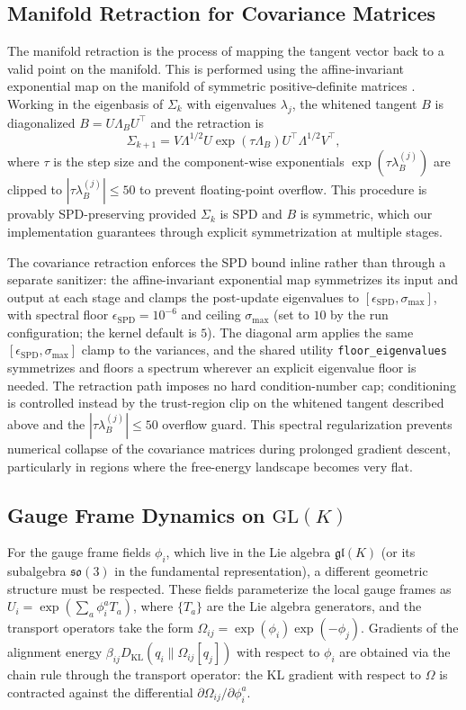 \documentclass[twoside,11pt]{article}
\begin{document}
\subsection{Manifold Retraction for Covariance Matrices}\label{sec:retraction}
The manifold retraction is the process of mapping the tangent vector back to a valid point on the manifold. This is performed using the affine-invariant exponential map on the manifold of symmetric positive-definite matrices \citep{Pennec2006,Bhatia2007,Absil2008}. Working in the eigenbasis of $\Sigma_k$ with eigenvalues $\lambda_j$, the whitened tangent $B$ is diagonalized $B = U\Lambda_B U^\top$ and the retraction is
\begin{equation}
\Sigma_{k+1} = V \Lambda^{1/2} U \exp(\tau \Lambda_B) U^\top \Lambda^{1/2} V^\top,
\end{equation}
where $\tau$ is the step size and the component-wise exponentials $\exp(\tau \lambda_B^{(j)})$ are clipped to $|\tau \lambda_B^{(j)}| \le 50$ to prevent floating-point overflow. This procedure is provably SPD-preserving provided $\Sigma_k$ is SPD and $B$ is symmetric, which our implementation guarantees through explicit symmetrization at multiple stages.

The covariance retraction enforces the SPD bound inline rather than through a
separate sanitizer: the affine-invariant exponential map symmetrizes its input and
output at each stage and clamps the post-update eigenvalues to
$[\epsilon_{\mathrm{SPD}}, \sigma_{\max}]$, with spectral floor
$\epsilon_{\mathrm{SPD}} = 10^{-6}$ and ceiling $\sigma_{\max}$ (set to $10$ by the
run configuration; the kernel default is $5$). The diagonal arm applies the same
$[\epsilon_{\mathrm{SPD}}, \sigma_{\max}]$ clamp to the variances, and the shared
utility \texttt{floor\_eigenvalues} symmetrizes and floors a spectrum wherever an
explicit eigenvalue floor is needed. The retraction path imposes no hard condition-number cap; conditioning is
controlled instead by the trust-region clip on the whitened tangent described above
and the $|\tau\lambda_B^{(j)}| \le 50$ overflow guard. This spectral regularization
prevents numerical collapse of the covariance matrices during prolonged gradient
descent, particularly in regions where the free-energy landscape becomes very flat.

\subsection{Gauge Frame Dynamics on $\mathrm{GL}(K)$}
For the gauge frame fields $\phi_i$, which live in the Lie algebra $\mathfrak{gl}(K)$ (or its subalgebra $\mathfrak{so}(3)$ in the fundamental representation), a different geometric structure must be respected. These fields parameterize the local gauge frames as $U_i = \exp(\sum_a \phi_i^a T_a)$, where $\{T_a\}$ are the Lie algebra generators, and the transport operators take the form $\Omega_{ij} = \exp(\phi_i)\exp(-\phi_j)$. Gradients of the alignment energy $\beta_{ij} D_{\mathrm{KL}}(q_i \| \Omega_{ij}[q_j])$ with respect to $\phi_i$ are obtained via the chain rule through the transport operator: the KL gradient with respect to $\Omega$ is contracted against the differential $\partial\Omega_{ij}/\partial\phi_i^a$.
\end{document}

